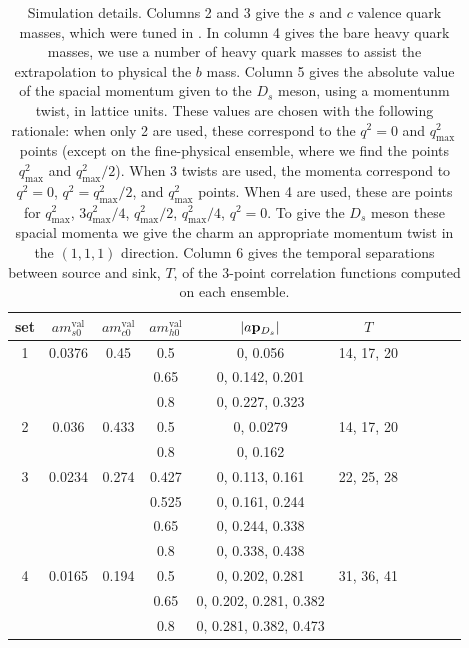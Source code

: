 \begin{table}[htb!]
  \begin{center}
    \begin{tabular}{c c c c c c c c c c}
      \hline
      set & $am_{s0}^{\text{val}}$ & $am_{c0}^{\text{val}}$ & $am^{\text{val}}_{h0}$ & $|a{\bf{p}}_{D_s}|$ & $T$ \\ [0.5ex]
      \hline
      1 & 0.0376 & 0.45
      & 0.5 & 0, 0.056 & 14, 17, 20 \\ [1ex]
      & & & 0.65 & 0, 0.142, 0.201 &  \\ [1ex]
      & & & 0.8 & 0, 0.227, 0.323 &  \\ [1ex]

      \hline
      2 & 0.036 & 0.433
      & 0.5 & 0, 0.0279 & 14, 17, 20 \\ [1ex]
      & & & 0.8 & 0, 0.162  & \\ [1ex]

      \hline
      3 & 0.0234 & 
      0.274 & 0.427 & 0, 0.113, 0.161 & 22, 25, 28 \\ [1ex]
      & & & 0.525 & 0, 0.161, 0.244 & \\ [1ex]
      & & & 0.65 & 0, 0.244, 0.338 & \\ [1ex]
      & & & 0.8 & 0, 0.338, 0.438 & \\ [1ex]

      \hline
      4 & 0.0165 
      & 0.194 & 0.5 & 0, 0.202, 0.281 & 31, 36, 41 \\ [1ex]
      & & & 0.65 & 0, 0.202, 0.281, 0.382 & \\ [1ex]
      & & & 0.8 & 0, 0.281, 0.382, 0.473 & \\ [1ex]
      \hline
    \end{tabular}
  \end{center}
  \caption{Simulation details. Columns 2 and 3 give the $s$ and $c$ valence quark masses, which were tuned in \cite{Chakraborty:2014aca}. In column 4 gives the bare heavy quark masses, we use a number of heavy quark masses to assist the extrapolation to physical the $b$ mass. Column 5 gives the absolute value of the spacial momentum given to the $D_s$ meson, using a momentunm twist, in lattice units. These values are chosen with the following rationale: when only 2 are used, these correspond to the $q^2=0$ and $q^2_{\text{max}}\,$ points (except on the fine-physical ensemble, where we find the points $q^2_{\text{max}}$ and $q^2_{\text{max}}/2$). When 3 twists are used, the momenta correspond to $q^2=0$, $q^2=q^2_{\text{max}}/2$, and $q^2_{\text{max}}$ points. When 4 are used, these are points for $q^2_{\text{max}}$, $3q^2_{\text{max}}/4$, $q^2_{\text{max}}/2$, $q^2_{\text{max}}/4$, $q^2=0$. To give the $D_s$ meson these spacial momenta we give the charm an appropriate momentum twist in the $(1,1,1)$ direction. Column 6 gives the temporal separations between source and sink, $T$, of the 3-point correlation functions computed on each ensemble.}
  \label{tab:simulation}
\end{table}

